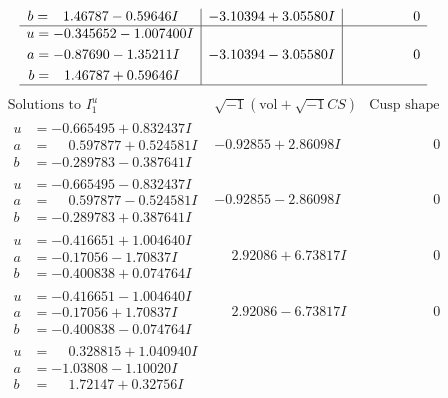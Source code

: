 \documentclass[1p]{elsarticle_modified}
\theoremstyle{definition}
\newcommand{\I}{\sqrt{-1}}
\begin{document}
$$\begin{array}{c|c|c}
\begin{aligned}
b &= \phantom{-}1.46787 - 0.59646 I\end{aligned}
 & -3.10394 + 3.05580 I & \phantom{-0.000000 } 0 \\ \hline\begin{aligned}
u &= -0.345652 - 1.007400 I \\
a &= -0.87690 - 1.35211 I \\
b &= \phantom{-}1.46787 + 0.59646 I\end{aligned}
 & -3.10394 - 3.05580 I & \phantom{-0.000000 } 0\\
 \hline 
 \end{array}$$\newpage$$\begin{array}{c|c|c}  
\text{Solutions to }I^u_{1}& \I (\text{vol} + \sqrt{-1}CS) & \text{Cusp shape}\\
 \hline 
\begin{aligned}
u &= -0.665495 + 0.832437 I \\
a &= \phantom{-}0.597877 + 0.524581 I \\
b &= -0.289783 - 0.387641 I\end{aligned}
 & -0.92855 + 2.86098 I & \phantom{-0.000000 } 0 \\ \hline\begin{aligned}
u &= -0.665495 - 0.832437 I \\
a &= \phantom{-}0.597877 - 0.524581 I \\
b &= -0.289783 + 0.387641 I\end{aligned}
 & -0.92855 - 2.86098 I & \phantom{-0.000000 } 0 \\ \hline\begin{aligned}
u &= -0.416651 + 1.004640 I \\
a &= -0.17056 - 1.70837 I \\
b &= -0.400838 + 0.074764 I\end{aligned}
 & \phantom{-}2.92086 + 6.73817 I & \phantom{-0.000000 } 0 \\ \hline\begin{aligned}
u &= -0.416651 - 1.004640 I \\
a &= -0.17056 + 1.70837 I \\
b &= -0.400838 - 0.074764 I\end{aligned}
 & \phantom{-}2.92086 - 6.73817 I & \phantom{-0.000000 } 0 \\ \hline\begin{aligned}
u &= \phantom{-}0.328815 + 1.040940 I \\
a &= -1.03808 - 1.10020 I \\
b &= \phantom{-}1.72147 + 0.32756 I\end{aligned}

\end{array}$$
\end{document}
